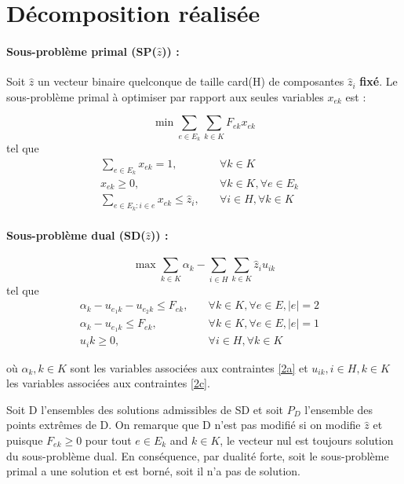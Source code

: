 \section{Décomposition réalisée}

\paragraph{Sous-problème primal (SP($\hat{z}$)) :}
Soit $\hat{z}$ un vecteur binaire quelconque de taille card(H) de composantes $\hat{z}_i$ \textbf{fixé}. Le sous-problème primal à optimiser par rapport aux seules variables $x_{ek}$ est : 

\[ \min \sum_{e \in E_k}\sum_{k \in K}F_{ek}x_{ek}\]
tel que
\begin{subequations}
    \begin{align}
        \sum_{e \in E_k}x_{ek} = 1, \quad &\forall{k\in K} \label{2a} &\\
        x_{ek} \ge 0, \quad &\forall{k \in K}, \forall{e \in E_k} \label{2b}&\\
        \sum_{e \in E_k:i\in e}x_{ek} \le \hat{z}_i,\quad &\forall{i \in H}, \forall{k\in K}\label{2c}
    \end{align}
\end{subequations}



\smallskip

\paragraph{Sous-problème dual (SD($\hat{z}$)) : } 

\[ \max \sum_{k \in K}\alpha_k - \sum_{i \in H}\sum_{k \in K} \hat{z}_iu_{ik}\]
tel que
\begin{subequations}
    \begin{align}
        \alpha_k - u_{e_1k} - u_{e_2k} \le F_{ek}, \quad &\forall{k\in K}, \forall{e \in E}, |e| = 2&\\
        \alpha_k - u_{e_1k} \le F_{ek}, \quad &\forall{k\in K}, \forall{e \in E}, |e| = 1&\\
        u_ik \ge 0, \quad &\forall{i \in H}, \forall{k \in K}
    \end{align}
\end{subequations}

où $\alpha_k, k\in K$ sont les variables associées aux contraintes \ref{2a} et $u_{ik}, i \in H, k \in K$ les variables associées aux contraintes \ref{2c}.


Soit D l'ensembles des solutions admissibles de SD et soit $P_D$ l'ensemble des points extrêmes de D. On remarque que D n'est pas modifié si on modifie $\hat{z}$ et puisque $F_{ek} \geq 0$ pour tout $e \in E_k$ and $k \in K$, le vecteur nul est toujours solution du sous-problème dual. En conséquence, par dualité forte, soit le sous-problème primal a une solution et est borné, soit il n'a pas de solution.


